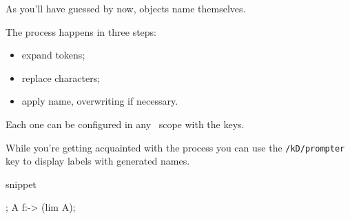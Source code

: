 As you'll have guessed by now, objects name themselves.

The process happens in three steps:
\begin{itemize}[nosep]
  \item expand tokens;
  \item replace characters;
  \item apply name, overwriting if necessary.
\end{itemize}

Each one can be configured in any \koDi\ scope with the keys.

While you're getting acquainted with the process
you can use the \lstinline|/kD/prompter| key to
display labels with generated names.

\begin{tcblisting}{snippet}
\begin{kodi}[prompter]
  ;
  \mor A f:-> (lim A);
\end{kodi}
\end{tcblisting}

